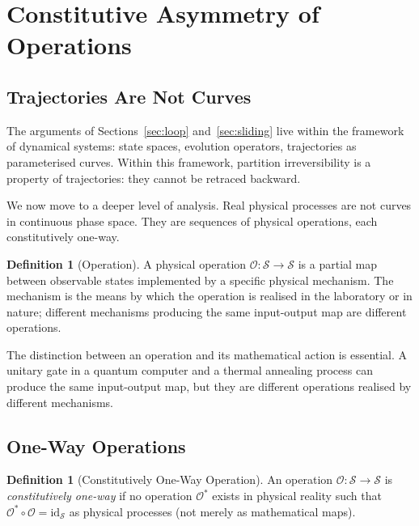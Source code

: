 \documentclass[twocolumn,10pt,a4paper]{article}
\theoremstyle{definition}
\newtheorem{definition}[theorem]{Definition}
\theoremstyle{remark}
\newcommand{\Operation}{\mathcal{O}}
\newcommand{\StateSpace}{\mathcal{S}}
\begin{document}
\section{Constitutive Asymmetry of Operations}
\label{sec:constitutive}

\subsection{Trajectories Are Not Curves}

The arguments of Sections~\ref{sec:loop} and~\ref{sec:sliding} live within the framework of dynamical systems: state spaces, evolution operators, trajectories as parameterised curves. Within this framework, partition irreversibility is a property of trajectories: they cannot be retraced backward.

We now move to a deeper level of analysis. Real physical processes are not curves in continuous phase space. They are sequences of physical operations, each constitutively one-way.

\begin{definition}[Operation]
A physical operation $\Operation: \StateSpace \to \StateSpace$ is a partial map between observable states implemented by a specific physical mechanism. The mechanism is the means by which the operation is realised in the laboratory or in nature; different mechanisms producing the same input-output map are different operations.
\end{definition}

The distinction between an operation and its mathematical action is essential. A unitary gate in a quantum computer and a thermal annealing process can produce the same input-output map, but they are different operations realised by different mechanisms.

\subsection{One-Way Operations}

\begin{definition}[Constitutively One-Way Operation]
An operation $\Operation: \StateSpace \to \StateSpace$ is \emph{constitutively one-way} if no operation $\Operation^*$ exists in physical reality such that $\Operation^* \circ \Operation = \mathrm{id}_{\StateSpace}$ as physical processes (not merely as mathematical maps).
\end{definition}
\end{document}
